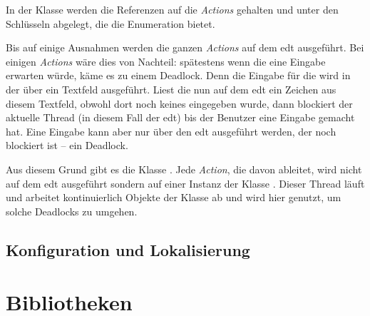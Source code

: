 In der Klasse  werden die Referenzen auf die \emph{Actions} gehalten und unter den Schlüsseln abgelegt, die die Enumeration  bietet.

Bis auf einige Ausnahmen werden die ganzen \emph{Actions} auf dem \gls{edt} ausgeführt. Bei einigen \emph{Actions} wäre dies von Nachteil: spätestens wenn die \mic{} eine Eingabe erwarten würde, käme es zu einem Deadlock. Denn die Eingabe für die \mic{} wird in der \mdg{} über ein Textfeld ausgeführt. Liest die \mic{} nun auf dem \gls{edt} ein Zeichen aus diesem Textfeld, obwohl dort noch keines eingegeben wurde, dann blockiert der aktuelle Thread (in diesem Fall der \gls{edt}) bis der Benutzer eine Eingabe gemacht hat. Eine Eingabe kann aber nur über den \gls{edt} ausgeführt werden, der noch blockiert ist -- ein Deadlock.

Aus diesem Grund gibt es die Klasse . Jede \emph{Action}, die davon ableitet, wird nicht auf dem \gls{edt} ausgeführt sondern auf einer Instanz der Klasse . Dieser Thread läuft und arbeitet kontinuierlich Objekte der Klasse  ab und wird hier genutzt, um solche Deadlocks zu umgehen.

\subsection{Konfiguration und Lokalisierung}

\section{Bibliotheken}

\section{\packages}